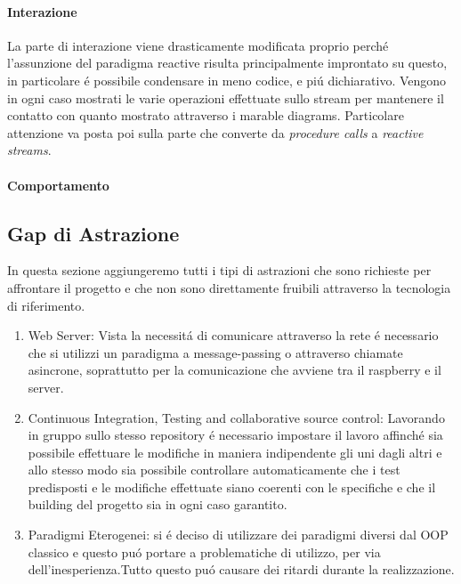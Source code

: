 \paragraph{Interazione} La parte di interazione viene drasticamente modificata proprio perch\'e l'assunzione del paradigma reactive risulta principalmente improntato su questo, in particolare \'e possibile condensare in meno codice, e pi\'u dichiarativo. Vengono in ogni caso mostrati le varie operazioni effettuate sullo stream per mantenere il contatto con quanto mostrato attraverso i marable diagrams. Particolare attenzione va posta poi sulla parte che converte da \textit{procedure calls} a \textit{reactive streams}.

\paragraph{Comportamento}

\subsection{Gap di Astrazione}

In questa sezione aggiungeremo tutti i tipi di astrazioni che sono richieste per affrontare il progetto e che non sono direttamente fruibili attraverso la tecnologia di riferimento.

\begin{enumerate}
  \item Web Server: Vista la necessit\'a di comunicare attraverso la rete \'e necessario che si utilizzi un paradigma a message-passing o attraverso chiamate asincrone, soprattutto per la comunicazione che avviene tra il raspberry e il server.
  \item Continuous Integration, Testing and collaborative source control: Lavorando in gruppo sullo stesso repository \'e necessario impostare il lavoro affinch\'e sia possibile effettuare le modifiche in maniera indipendente gli uni dagli altri e allo stesso modo sia possibile controllare automaticamente che i test predisposti e le modifiche effettuate siano coerenti con le specifiche e che il building del progetto sia in ogni caso garantito.
  \item{Paradigmi Eterogenei}: si \'e deciso di utilizzare dei paradigmi diversi dal OOP classico e questo pu\'o portare a problematiche di utilizzo, per via dell'inesperienza.Tutto questo pu\'o causare dei ritardi durante la realizzazione.
\end{enumerate}


